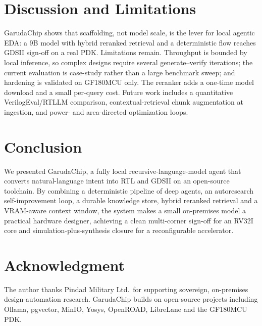\documentclass[conference]{IEEEtran}
\begin{document}
\section{Discussion and Limitations}
GarudaChip shows that scaffolding, not model scale, is the lever for local
agentic EDA: a 9B model with hybrid reranked retrieval and a deterministic flow
reaches GDSII sign-off on a real PDK. Limitations remain. Throughput is bounded
by local inference, so complex designs require several generate--verify
iterations; the current evaluation is case-study rather than a large benchmark
sweep; and hardening is validated on GF180MCU only. The reranker adds a one-time
model download and a small per-query cost. Future work includes a quantitative
VerilogEval/RTLLM comparison, contextual-retrieval chunk augmentation at
ingestion, and power- and area-directed optimization loops.

\section{Conclusion}
We presented GarudaChip, a fully local recursive-language-model agent that
converts natural-language intent into RTL and GDSII on an open-source toolchain.
By combining a deterministic pipeline of deep agents, an autoresearch
self-improvement loop, a durable knowledge store, hybrid reranked retrieval and a
VRAM-aware context window, the system makes a small on-premises model a practical
hardware designer, achieving a clean multi-corner sign-off for an RV32I core and
simulation-plus-synthesis closure for a reconfigurable accelerator.

\section*{Acknowledgment}
The author thanks Pindad Military Ltd.\ for supporting sovereign, on-premises
design-automation research. GarudaChip builds on open-source projects including
Ollama, pgvector, MinIO, Yosys, OpenROAD, LibreLane and the GF180MCU PDK.
\end{document}
